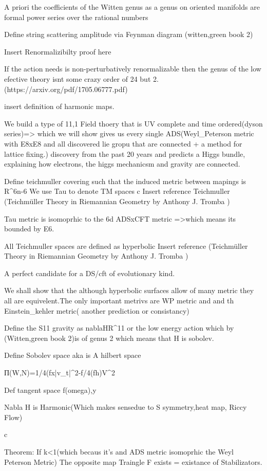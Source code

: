 A priori the coefficients of the Witten genus as a genus on oriented manifolds are formal power series over the rational numbers


Define string scattering amplitude via Feynman diagram (witten,green book 2)

Insert Renormalizibilty proof here

If the action needs is non-perturbatively renormalizable then the genus of the low efective theory isnt some crazy order of 24 but 2.(https://arxiv.org/pdf/1705.06777.pdf)

insert definition of harmonic maps.

We build a type of 11,1 Field thoery that is UV complete and time ordered(dyson series)=> which we will show gives us every single ADS(Weyl_Peterson metric with E8xE8 and all discovered lie gropu that are connected + a method for lattice fixing.) discovery from the past 20 years and predicts a Higgs bundle, explaining how electrons, the higgs mechanicsm and gravity are connected.


Define teichmuller covering such that the induced metric between mapings is R^6n-6 We use Tau to denote TM spaces 
c
Insert reference Teichmuller (Teichmüller Theory in Riemannian Geometry by Anthony J. Tromba )

Tau metric is isomoprhic to the 6d ADSxCFT metric =>which means its bounded by E6.

All Teichmuller spaces are defined as hyperbolic Insert reference (Teichmüller Theory in Riemannian Geometry by Anthony J. Tromba )

A perfect candidate for a DS/cft of evolutionary kind.

We shall show that the although hyperbolic surfaces allow of many metric they all are equivelent.The only important metrivs are WP metric and and th Einstein_kehler metric( another prediction or consistancy)

Define the S11 gravity as nablaHR^11 or the low energy action which by (Witten,green book 2)is of genus 2 which means that H is sobolev.

Define Sobolev space aka is A hilbert space

П(W,N)=1/4(fx|v_t|^2-f/4(fh)V^2

Def tangent space f(omega),y

Nabla H is Harmonic(Which makes sensedue to S symmetry,heat map, Riccy Flow)

c

Theorem: If k<1(which becaus it's and ADS metric isomoprhic the Weyl Peterson Metric) The opposite map  Traingle F  exists = existance of Stabilizators.

